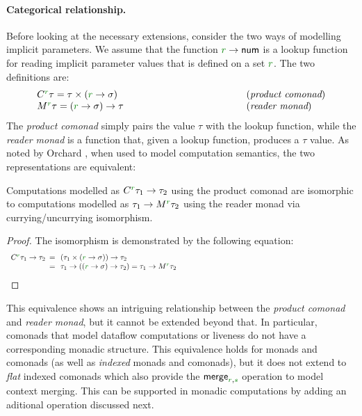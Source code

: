 \paragraph{Categorical relationship.}
Before looking at the necessary extensions, consider the two ways of modelling implicit
parameters. We assume that the function $\cclrd{r} \rightarrow \ident{num}$ is a lookup function
for reading implicit parameter values that is defined on a set $\cclrd{r}$. The two definitions
are:
%
\begin{equation*}
\begin{array}{lll}
 \ctyp{\cclrd{r}}\tau = \tau \times (\cclrd{r} \rightarrow \sigma) &~\hspace{10em}~& (\emph{product comonad}) \\
 \mtyp{\cclrd{r}}\tau = (\cclrd{r} \rightarrow \sigma) \rightarrow \tau && (\emph{reader monad})
\end{array}
\end{equation*}
%
The \emph{product comonad} simply pairs the value $\tau$ with the lookup function, while
the \emph{reader monad} is a function that, given a lookup function, produces a $\tau$ value.
As noted by Orchard \cite{comonads-vs-monads}, when used to model computation semantics, the
two representations are equivalent:
%
\begin{remark}
Computations modelled as $\ctyp{\cclrd{r}}{\tau_1}\rightarrow\tau_2$ using the product comonad
are isomorphic to computations modelled as $\tau_1\rightarrow\mtyp{\cclrd{r}}{\tau_2}$ using the
reader monad via currying/uncurrying isomorphism.
\end{remark}
\begin{proof}
The isomorphism is demonstrated by the following equation:
\begin{equation*}
\begin{array}{lll}
 \ctyp{\cclrd{r}}{\tau_1} \rightarrow \tau_2 &\narrow{=}&
 (\tau_1 \times (\cclrd{r} \rightarrow \sigma)) \rightarrow \tau_2 \\
 &\narrow{=}& \tau_1 \rightarrow ((\cclrd{r} \rightarrow \sigma) \rightarrow \tau_2) =
 \tau_1 \rightarrow \mtyp{\cclrd{r}}{\tau_2} \hspace{23em}\qedhere \\
\end{array}
\end{equation*}
\end{proof}

\noindent
This equivalence shows an intriguing relationship between the \emph{product comonad} and
\emph{reader monad}, but it cannot be extended beyond that. In particular, comonads that model
dataflow computations or liveness do not have a corresponding monadic structure.
This equivalence holds for monads and comonads (as well as \emph{indexed} monads
and comonads), but it does not extend to \emph{flat} indexed comonads which also provide
the $\ident{merge}_{\cclrd{r}, \cclrd{s}}$ operation to model context merging. This can be
supported in monadic computations by adding an aditional operation discussed next.

